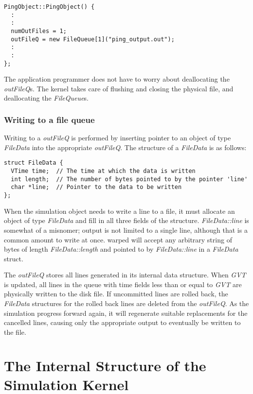 \documentclass[11pt]{report}
\begin{document}
\begin{verbatim}
PingObject::PingObject() {
  :
  :
  numOutFiles = 1;
  outFileQ = new FileQueue[1]("ping_output.out");
  :
  :
};
\end{verbatim}

The application programmer does not have to worry about deallocating the
{\it outFileQ}s.  The kernel takes care of flushing and closing the
physical file, and deallocating the {\it FileQueue}s.

\subsection{Writing to a file queue}

Writing to a {\it outFileQ} is performed by inserting pointer to an
object of type {\it FileData} into the appropriate {\it outFileQ}.
The structure of a {\it FileData} is as follows:

\begin{verbatim}
struct FileData {
  VTime time;  // The time at which the data is written
  int length;  // The number of bytes pointed to by the pointer 'line'
  char *line;  // Pointer to the data to be written
};
\end{verbatim}

When the simulation object needs to write a line to a file, it must
allocate an object of type {\it FileData} and fill in all three fields of
the structure.  {\it FileData::line} is somewhat of a misnomer; output is
not limited to a single line, although that is a common amount to write at
once.  {\sc warped} will accept any arbitrary string of bytes of length
{\it FileData::length} and pointed to by {\it FileData::line} in a {\it
FileData} struct.

The {\it outFileQ} stores all lines generated in its internal data
structure.  When {\it GVT} is updated, all lines in the queue with time
fields less than or equal to {\it GVT} are physically written to the disk
file.  If uncommitted lines are rolled back, the {\it FileData} structures
for the rolled back lines are deleted from the {\it outFileQ}.  As the
simulation progress forward again, it will regenerate suitable
replacements for the cancelled lines, causing only the appropriate output
to eventually be written to the file.

\chapter{The Internal Structure of the Simulation Kernel}
\end{document}
